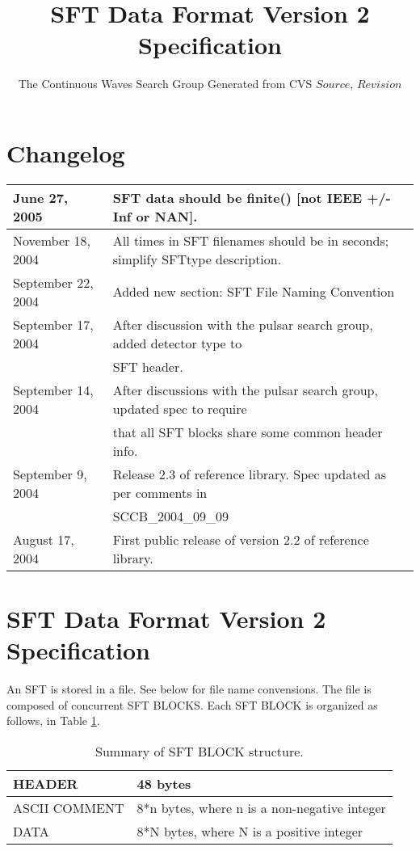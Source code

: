 \documentclass{ligodcc}
\title{SFT Data Format Version 2 Specification}
\author{The Continuous Waves Search Group \break Generated from CVS $Source$, $Revision$ }
\begin{document}
\maketitle

\section{Changelog}


\begin{table}[ht]
\centering
\begin{tabular}{|l|l|}
\hline
June 27, 2005     & SFT data should be finite() [not IEEE +/- Inf or NAN].\\
\hline
November 18, 2004 & All times in SFT filenames should be in seconds; simplify SFTtype description. \\
\hline
September 22, 2004 & Added new section: SFT File Naming Convention \\
\hline
September 17, 2004 & After discussion with the pulsar search group, added detector type to\\
   & SFT header. \\
\hline
September 14, 2004 & After discussions with the pulsar search group, updated spec to require\\
   & that all SFT blocks share some common header info. \\
\hline
September 9, 2004 & Release 2.3 of reference library.  Spec updated as per comments in\\
   & SCCB\_2004\_09\_09 \\
\hline
August 17, 2004  & First public release of version 2.2 of reference library. \\
\hline
\end{tabular}
\end{table}
 
\section{SFT Data Format Version 2 Specification}

An SFT is stored in a file. See below for file name convensions. The
file is composed of concurrent SFT BLOCKS. Each SFT BLOCK is organized as follows,
in Table \ref{tab:summary_struct}.

\begin{table}[ht]
\centering
\begin{tabular}{|l|l|}
\hline
   HEADER & 48 bytes\\
\hline

 ASCII COMMENT & 8*n bytes,
 where n is a non-negative
 integer\\
\hline

  DATA & 8*N bytes,
 where N is a positive
 integer\\
\hline
\end{tabular}
\caption{Summary of SFT BLOCK structure.}
\label{tab:summary_struct}
\end{table}
\end{document}
